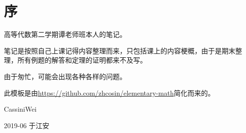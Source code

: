 \documentclass[UTF8]{ctexbook}
\title{\kaishu{高等代数-2笔记整理}}
\author{CassiniWei}
\date{}
\begin{document}
\maketitle
\chapter*{序}
\thispagestyle{empty}
高等代数第二学期谭老师班本人的笔记。\par
笔记是按照自己上课记得内容整理而来，只包括课上的内容梗概，由于是期末整理，所有例题的解答和定理的证明都来不及写。
\par
由于匆忙，可能会出现各种各样的问题。
\par
此模板是由\hyperref[zhcosin/elementary-math]{https://github.com/zhcosin/elementary-math}简化而来的。

\vspace{1.5cm}

\hfill CassiniWei \hspace{3.5em}

\hfill 2019-06 于江安 \hspace{1.5em}

\tableofcontents
%


\mainmatter
\setcounter{chapter}{3}




\end{document}
